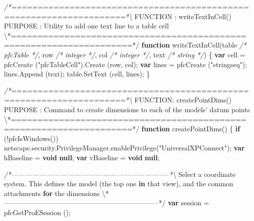 \documentclass[]{article}
\newenvironment{Shaded}{}{}
\newcommand{\KeywordTok}[1]{\textcolor[rgb]{0.00,0.44,0.13}{\textbf{{#1}}}}
\newcommand{\StringTok}[1]{\textcolor[rgb]{0.25,0.44,0.63}{{#1}}}
\newcommand{\CommentTok}[1]{\textcolor[rgb]{0.38,0.63,0.69}{\textit{{#1}}}}
\newcommand{\OtherTok}[1]{\textcolor[rgb]{0.00,0.44,0.13}{{#1}}}
\newcommand{\FunctionTok}[1]{\textcolor[rgb]{0.02,0.16,0.49}{{#1}}}
\newcommand{\NormalTok}[1]{{#1}}
\begin{document}
\begin{Shaded}
\begin{Highlighting}[]
\CommentTok{/*====================================================================*\textbackslash{}}
\NormalTok{FUNCTION : }\FunctionTok{writeTextInCell}\NormalTok{() }
\NormalTok{PURPOSE  : Utility to add one text line to a table cell}
\NormalTok{\textbackslash{}*====================================================================*}\OtherTok{/}
\KeywordTok{function} \FunctionTok{writeTextInCell}\NormalTok{(table }\CommentTok{/* pfcTable */}\NormalTok{, row }\CommentTok{/* integer */}\NormalTok{,}
             \NormalTok{col }\CommentTok{/* integer */}\NormalTok{, text }\CommentTok{/* string */}\NormalTok{)}
\NormalTok{\{}
  \KeywordTok{var} \NormalTok{cell = }\FunctionTok{pfcCreate} \NormalTok{(}\StringTok{"pfcTableCell"}\NormalTok{).}\FunctionTok{Create} \NormalTok{(row, col);}
  \KeywordTok{var} \NormalTok{lines = }\FunctionTok{pfcCreate} \NormalTok{(}\StringTok{"stringseq"}\NormalTok{);}
  \OtherTok{lines}\NormalTok{.}\FunctionTok{Append} \NormalTok{(text);}
  \OtherTok{table}\NormalTok{.}\FunctionTok{SetText} \NormalTok{(cell, lines);}
\NormalTok{\}}

\CommentTok{/*====================================================================*\textbackslash{}}
\NormalTok{FUNCTION: }\FunctionTok{createPointDims}\NormalTok{() }
\NormalTok{PURPOSE  : Command to create dimensions to each of the models}\StringTok{' datum points}
\NormalTok{\textbackslash{}*====================================================================*}\OtherTok{/}
\KeywordTok{function} \FunctionTok{createPointDims}\NormalTok{()}
\NormalTok{\{}
  \KeywordTok{if} \NormalTok{(!}\FunctionTok{pfcIsWindows}\NormalTok{())}
    \OtherTok{netscape}\NormalTok{.}\OtherTok{security}\NormalTok{.}\OtherTok{PrivilegeManager}\NormalTok{.}\FunctionTok{enablePrivilege}\NormalTok{(}\StringTok{"UniversalXPConnect"}\NormalTok{);   }
  \KeywordTok{var} \NormalTok{hBaseline = }\KeywordTok{void} \KeywordTok{null}\NormalTok{;}
  \KeywordTok{var} \NormalTok{vBaseline = }\KeywordTok{void} \KeywordTok{null}\NormalTok{;}

\CommentTok{/*--------------------------------------------------------------------*\textbackslash{}}
  \NormalTok{Select a coordinate }\OtherTok{system}\NormalTok{. }\FunctionTok{This} \FunctionTok{defines} \FunctionTok{the} \FunctionTok{model} \NormalTok{(the top one}
  \KeywordTok{in} \NormalTok{that view), and the common attachments }\KeywordTok{for} \NormalTok{the dimensions}
\NormalTok{\textbackslash{}*--------------------------------------------------------------------*}\OtherTok{/}
  \KeywordTok{var} \NormalTok{session = }\FunctionTok{pfcGetProESession} \NormalTok{();}
  

\end{Highlighting}
\end{Shaded}
\end{document}
